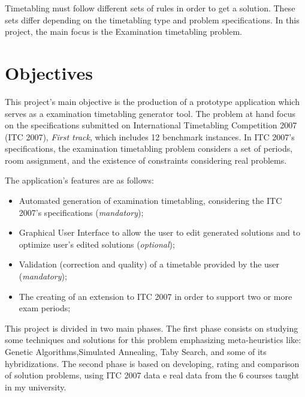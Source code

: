 Timetabling must follow different sets of rules in order to get a solution. These sets differ depending on the timetabling type and problem specifications. In this project, the main focus is the Examination timetabling problem. 

\section{Objectives}

This project's main objective is the production of a prototype application which serves as a examination timetabling generator tool. The problem at hand focus on the specifications submitted on International Timetabling Competition 2007 (ITC 2007), \textit{First track}, which includes 12 benchmark instances. In ITC 2007's specifications, the examination timetabling problem considers a set of periods, room assignment, and the existence of constraints considering real problems.

The application's features are as follows:

\begin{itemize}
	\item Automated generation of examination timetabling, considering the ITC 2007's specifications (\textit{mandatory});
	\item Graphical User Interface to allow the user to edit generated solutions and to optimize user's edited solutions (\textit{optional});
	\item Validation (correction and quality) of a timetable provided by the user (\textit{mandatory});
	\item The creating of an extension to ITC 2007 in order to support two or more exam periods;
\end{itemize}

This project is divided in two main phases. The first phase consists on studying some techniques and solutions for this problem emphasizing meta-heuristics like: Genetic Algorithms,Simulated Annealing, Taby Search, and some of its hybridizations. The second phase is based on developing, rating and comparison of solution problems, using ITC 2007 data e real data from the 6 courses taught in my university.


